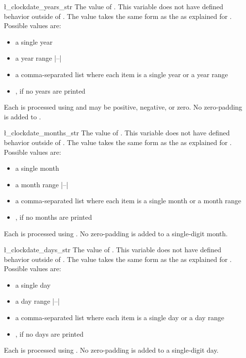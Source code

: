 \documentclass{beerydoc}
\begin{document}
\begin{codedoc}{\l_clockdate_years_str}
  The value of .
  This variable does not have defined behavior outside of .
  The value takes the same form as the  as explained for
  .
  Possible values are:
  \begin{itemize}
    \item a single year 
    \item a year range |--|
    \item
    a comma-separated list where each item is a single year or a year range
    \item {}, if no years are printed
  \end{itemize}

  Each  is processed using  and may be positive,
  negative, or zero.
  No zero-padding is added to .
\end{codedoc}

\begin{codedoc}{\l_clockdate_months_str}
  The value of .
  This variable does not have defined behavior outside of .
  The value takes the same form as the  as explained for
  .
  Possible values are:
  \begin{itemize}
    \item a single month 
    \item a month range |--|
    \item
    a comma-separated list where each item is a single month or a month range
    \item {}, if no months are printed
  \end{itemize}

  Each  is processed using .
  No zero-padding is added to a single-digit month.
\end{codedoc}

\begin{codedoc}{\l_clockdate_days_str}
  The value of .
  This variable does not have defined behavior outside of .
  The value takes the same form as the  as explained for
  .
  Possible values are:
  \begin{itemize}
    \item a single day 
    \item a day range |--|
    \item a comma-separated list where each item is a single day or a day range
    \item {}, if no days are printed
  \end{itemize}

  Each  is processed using .
  No zero-padding is added to a single-digit day.
\end{codedoc}
\end{document}
